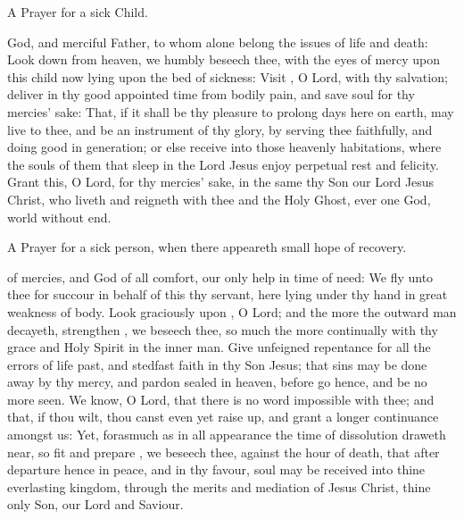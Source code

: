 \begin{rubric}
A Prayer for a sick Child.
\end{rubric}

 God, and merciful Father, to whom alone belong the issues of life and death:
Look down from heaven, we humbly beseech thee, with the eyes of mercy upon this child now lying upon the bed of sickness:
Visit , O Lord, with thy salvation; deliver  in thy good appointed time from  bodily pain, and save  soul for thy mercies' sake:
That, if it shall be thy pleasure to prolong  days here on earth,  may live to thee, and be an instrument of thy glory, by serving thee faithfully, and doing good in  generation;
or else receive  into those heavenly habitations, where the souls of them that sleep in the Lord Jesus enjoy perpetual rest and felicity.
Grant this, O Lord, for thy mercies' sake, in the same thy Son our Lord Jesus Christ, who liveth and reigneth with thee and the Holy Ghost, ever one God, world without end.

\newpage

\begin{rubric}
A Prayer for a sick person, when there appeareth small hope of recovery.
\end{rubric}

 of mercies, and God of all comfort, our only help in time of need: We fly unto thee for succour in behalf of this thy servant, here lying under thy hand in great weakness of body.
Look graciously upon , O Lord; and the more the outward man decayeth, strengthen , we beseech thee, so much the more continually with thy grace and Holy Spirit in the inner man.
Give  unfeigned repentance for all the errors of  life past, and stedfast faith in thy Son Jesus; that  sins may be done away by thy mercy, and  pardon sealed in heaven, before  go hence, and be no more seen.
We know, O Lord, that there is no word impossible with thee; and that, if thou wilt, thou canst even yet raise  up, and grant  a longer continuance amongst us: Yet, forasmuch as in all appearance the time of  dissolution draweth near, so fit and prepare , we beseech thee, against the hour of death, that after  departure hence in peace, and in thy favour,  soul may be received into thine everlasting kingdom, through the merits and mediation of Jesus Christ, thine only Son, our Lord and Saviour.

